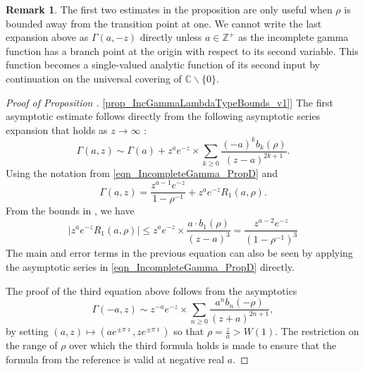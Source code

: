 \documentclass[11pt,reqno,a4letter]{article}
\newcommand{\hlocalref}[1]{\hyperref[#1]{\ref{#1}}}
\numberwithin{equation}{section}
\numberwithin{figure}{section}
\numberwithin{table}{section}
\theoremstyle{plain}
\numberwithin{theorem}{section}
\theoremstyle{definition}
\newtheorem{remark}[theorem]{Remark}
\begin{document}
\begin{remark}
The first two estimates in the proposition 
are only useful when $\rho$ is bounded away from the transition point at one. 
We cannot write the last expansion above 
as $\Gamma(a, -z)$ directly unless $a \in \mathbb{Z}^{+}$ 
as the incomplete gamma function 
has a branch point at the origin with respect to its second variable. 
This function becomes a single-valued 
analytic function of its second input by continuation 
on the universal covering of $\mathbb{C} \mathbin{\backslash} \{0\}$. 
\end{remark}

\begin{proof}[Proof of Proposition \hlocalref{prop_IncGammaLambdaTypeBounds_v1}] 
The first asymptotic estimate follows directly from the following 
asymptotic series expansion that holds as $z \rightarrow \infty$ 
\cite[Eq.\ (2.1)]{NEMES2019}: 
\[
\Gamma(a, z) \sim \Gamma(a) + z^a e^{-z} \times \sum_{k \geq 0} 
     \frac{(-a)^k b_k(\rho)}{(z-a)^{2k+1}}. 
\]
Using the notation from \eqref{eqn_IncompleteGamma_PropD} and \cite{NEMES2016} 
\[
\Gamma(a, z) = \frac{z^{a-1} e^{-z}}{1-\rho^{-1}} + z^{a} e^{-z} R_1(a, \rho). 
\]
From the bounds in \cite[\S 3.1]{NEMES2016}, we have 
\[
\left\lvert z^{a} e^{-z} R_1(a, \rho) \right\rvert \leq 
     z^a e^{-z} \times \frac{a \cdot b_1(\rho)}{(z-a)^{3}} = 
     \frac{z^{a-2} e^{-z}}{(1-\rho^{-1})^{3}}
\]
The main and error terms in the previous equation can also be 
seen by applying the asymptotic series in 
\eqref{eqn_IncompleteGamma_PropD} directly. 

The proof of the third equation above follows from the asymptotics 
\cite[Eq.\ (1.1)]{NEMES2015C}
\[
\Gamma(-a, z) \sim z^{-a} e^{-z} \times \sum_{n \geq 0} \frac{a^n b_n(-\rho)}{(z+a)^{2n+1}}, 
\]
by setting $(a, z) \mapsto \left(a e^{\pm \pi\imath}, z e^{\pm \pi\imath}\right)$ so that 
$\rho = \frac{z}{a} > W(1)$. 
The restriction on the range of $\rho$ over which the third formula holds is made to ensure that 
the formula from the reference is valid at negative real $a$. 
\end{proof}
\end{document}
